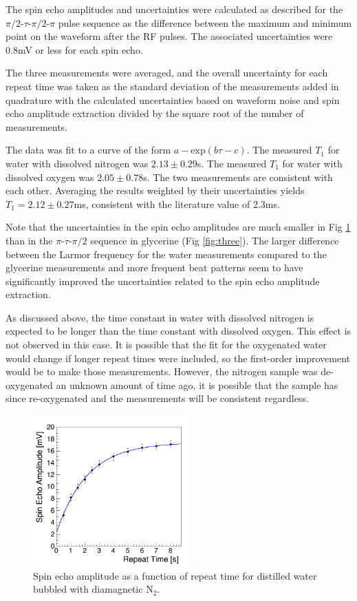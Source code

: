 The spin echo amplitudes and uncertainties were calculated as described for the $\pi/2$-$\tau$-$\pi/2$-$\pi$ pulse sequence as the difference between the maximum and minimum point on the waveform after the RF pulses. The associated uncertainties were 0.8mV or less for each spin echo. 

The three measurements were averaged, and the overall uncertainty for each repeat time was taken as the standard deviation of the measurements added in quadrature with the calculated uncertainties based on waveform noise and spin echo amplitude extraction divided by the square root of the number of measurements.

The data was fit to a curve of the form $a-\mathrm{exp}(b\tau-c)$. The measured $T_{1}$ for water with dissolved nitrogen was $2.13\pm0.29$s. The measured $T_{1}$ for water with dissolved oxygen was $2.05\pm0.78$s. The two measurements are consistent with each other. Averaging the results weighted by their uncertainties yields $T_1=2.12\pm0.27$ms, consistent with the literature value of 2.3ms\cite{blo}. 

Note that the uncertainties in the spin echo amplitudes are much smaller in Fig \ref{fig:water} than in the $\pi$-$\tau$-$\pi/2$ sequence in glycerine (Fig \ref{fig:three}). The larger difference between the Larmor frequency for the water measurements compared to the glycerine measurements and more frequent beat patterns seem to have significantly improved the uncertainties related to the spin echo amplitude extraction.

As discussed above, the time constant in water with dissolved nitrogen is expected to be longer than the time constant with dissolved oxygen. This effect is not observed in this case. It is possible that the fit for the oxygenated water would change if longer repeat times were included, so the first-order improvement would be to make those measurements. However, the nitrogen sample was de-oxygenated an unknown amount of time ago, it is possible that the sample has since re-oxygenated and the measurements will be consistent regardless.

\begin{figure}[htb]
\includegraphics[width=6cm]{water_n2.png}
\caption{Spin echo amplitude as a function of repeat time for distilled water bubbled with diamagnetic N$_2$. }
\label{fig:water}
\end{figure}

